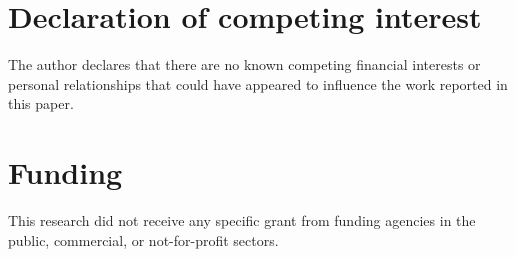\documentclass[preprint,12pt,authoryear]{elsarticle}
\theoremstyle{remark}
\begin{document}
\section*{Declaration of competing interest}
The author declares that there are no known competing financial interests or personal relationships that could have
appeared to influence the work reported in this paper.

\section*{Funding}
This research did not receive any specific grant from funding agencies in the public, commercial, or not-for-profit
sectors.



\end{document}
